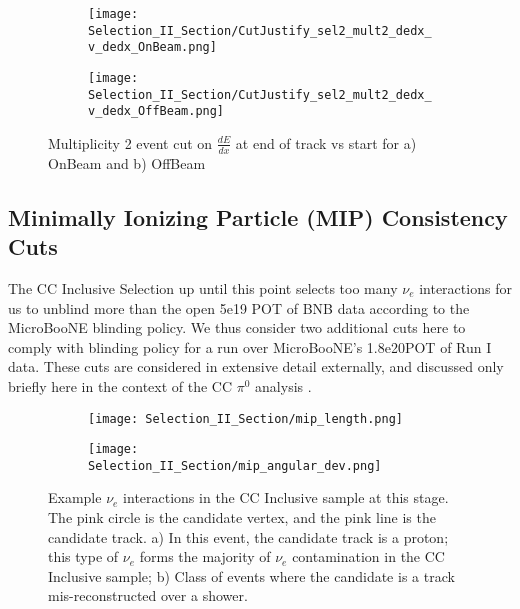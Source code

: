 \begin{figure}[H]
\centering
\begin{subfigure}[t]{0.25\textwidth}
    \centering
\texttt{[image: Selection\_II\_Section/CutJustify\_sel2\_mult2\_dedx\_v\_dedx\_OnBeam.png]}
    \caption{ }
  \end{subfigure} 
  \hspace{1mm}
  \begin{subfigure}[t]{0.25\textwidth}
    \centering
    \texttt{[image: Selection\_II\_Section/CutJustify\_sel2\_mult2\_dedx\_v\_dedx\_OffBeam.png]}
    \caption{ }
  \end{subfigure} 

\caption{ Multiplicity 2 event cut on $\frac{dE}{dx}$ at end of track vs start for a) OnBeam and b) OffBeam }
\label{fig:cutjust_sel2_onbeam_mult2_dedx_v_dedx}
\end{figure}



\clearpage
\subsection{ Minimally Ionizing Particle (MIP) Consistency Cuts}

The CC Inclusive Selection up until this point selects too many $\nu_e$ interactions for us to unblind more than the open 5e19 POT of BNB data according to the MicroBooNE blinding policy. We thus consider two additional cuts here to comply with blinding policy for a run over MicroBooNE's 1.8e20POT of Run I data. These cuts are considered in extensive detail externally, and discussed only briefly here in the context of the CC $\pi^0$ analysis \cite{bib:jz_unblinding_note}. 


\begin{figure}[H]
\centering
  \begin{subfigure}[t]{0.6\textwidth}
    \centering
\texttt{[image: Selection\_II\_Section/mip\_length.png]}
    \caption{ }
  \end{subfigure} 
  \hspace{20mm}
  \begin{subfigure}[t]{0.8\textwidth}
    \centering
\texttt{[image: Selection\_II\_Section/mip\_angular\_dev.png]}
    \caption{ }
  \end{subfigure} 
\caption{ Example $\nu_e$ interactions in the CC Inclusive sample at this stage.  The pink circle is the candidate vertex, and the pink line is the candidate track. a) In this event, the candidate track is a proton; this type of $\nu_e$ forms the majority of $\nu_e$ contamination in the CC Inclusive sample; b) Class of events where the candidate is a track mis-reconstructed over a shower. }
\label{fig:mip_ex_len_angular}
\end{figure}


